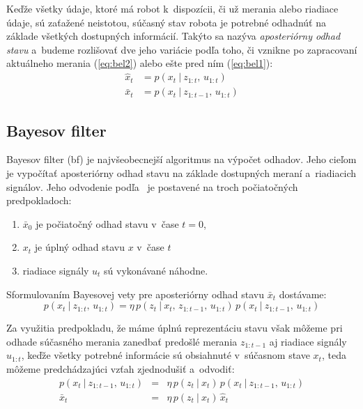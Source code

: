      Keďže všetky údaje, ktoré má robot k~dispozícii, či už merania alebo riadiace údaje, sú zaťažené neistotou, súčasný stav robota je potrebné odhadnúť na základe všetkých dostupných informácií. Takýto sa nazýva \emph{aposteriórny odhad stavu} a~budeme rozlišovať dve jeho variácie podľa toho, či vznikne po zapracovaní aktuálneho merania (\ref{eq:bel2}) alebo ešte pred ním (\ref{eq:bel1}):
      \begin{subequations}
        \begin{align}
          \hat x_t &= p(x_t\ |\ z_{1:t},\, u_{1:t} ) \label{eq:bel1}\\
          \bar{x}_t &= p(x_t\ |\ z_{1:t-1},\, u_{1:t}) \label{eq:bel2}
        \end{align}
      \end{subequations}
      
  \subsection{Bayesov filter}
    Bayesov filter (\acrshort{bf}) je najvšeobecnejší algoritmus na výpočet odhadov. Jeho cieľom je vypočítať aposteriórny odhad stavu na základe dostupných meraní a~riadiacich signálov. Jeho odvodenie podľa~\cite{thrunProbabilisticRobotics2005} je postavené na troch počiatočných predpokladoch:
    \begin{enumerate}
      \item $\bar{x}_0$ je počiatočný odhad stavu v~čase $t = 0$,
      \item $x_t$ je úplný odhad stavu $x$ v~čase $t$
      \item riadiace signály $u_t$ sú vykonávané náhodne.
    \end{enumerate}

    Sformulovaním Bayesovej vety pre aposteriórny odhad stavu $\bar{x}_t$ dostávame:
    \begin{equation}
      p(x_t\ |\ z_{1:t},\, u_{1:t}) = \eta\, p(z_t\ |\ x_t,\, z_{1:t-1},\, u_{1:t})\, p(x_t\ |\ z_{1:t-1},\, u_{1:t})
    \end{equation}

    Za využitia predpokladu, že máme úplnú reprezentáciu stavu však môžeme pri odhade súčasného merania zanedbať predošlé merania $z_{1:t-1}$ aj riadiace signály $u_{1:t}$, keďže všetky potrebné informácie sú obsiahnuté v~súčasnom stave $x_t$, teda môžeme predchádzajúci vzťah zjednodušiť a~odvodiť:
    \begin{eqnarray}
      p(x_t\ |\ z_{1:t-1},\, u_{1:t}) &=& \eta\, p(z_t\ |\ x_t)\, p(x_t\ |\ z_{1:t-1},\, u_{1:t}) \\
      \bar{x}_t &=& \eta\, p(z_t\ |\ x_t)\, \hat{x}_t \label{eq:update}
    \end{eqnarray}

